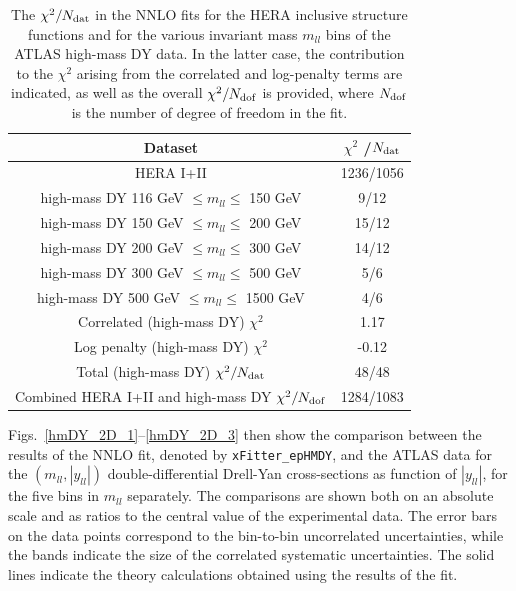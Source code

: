 \begin{table}[t]
  \centering
  \begin{tabular}{|c|c|}
    \hline
    Dataset  &   $\chi^2$ /$N_{\rm dat}$ \\
    \hline
    \hline
    HERA I+II & 1236/1056\\
    \hline
    high-mass DY  116 GeV $\le m_{ll} \le $ 150 GeV  &  9/12 \\
    high-mass DY  150 GeV $\le m_{ll} \le $ 200 GeV  &  15/12 \\
    high-mass DY  200 GeV $\le m_{ll} \le $ 300 GeV  &  14/12 \\
    high-mass DY  300 GeV $\le m_{ll} \le $ 500 GeV  &  5/6 \\
    high-mass DY  500 GeV $\le m_{ll} \le $ 1500 GeV &  4/6 \\
    \hline
    Correlated (high-mass DY) $\chi^2$ & 1.17 \\
    Log penalty (high-mass DY) $\chi^2$  & -0.12 \\
    \hline
    Total  (high-mass DY) $\chi^2/N_{\rm dat}$  & 48/48 \\
    \hline
    \hline
    Combined HERA I+II and high-mass DY $\chi^2/N_{\rm dof}$   & 1284/1083 \\
    \hline
    \end{tabular}
  \caption{The $\chi^{2}/N_{\rm dat}$ in the NNLO fits for the
    HERA inclusive structure functions and for the various
    invariant mass $m_{ll}$ bins of the ATLAS high-mass DY data.
    In the latter case, the contribution to the
    $\chi^2$ arising from the correlated and log-penalty terms are indicated,
    as well as the overall $\chi^2/N_{\rm dof}$ is provided,  where $N_{\rm dof}$ is
    the number of degree of freedom in the fit.
\label{tab:chi2fit}
  }
\end{table}

Figs.~\ref{hmDY_2D_1}--\ref{hmDY_2D_3} then show the
comparison between the results of the NNLO fit,
denoted by {\tt xFitter\_epHMDY},
and the ATLAS data
  for the $(m_{ll},|y_{ll}|)$ double-differential Drell-Yan cross-sections
  as function of $|y_{ll}|$, for the five bins in $m_{ll}$ separately.
  The comparisons are shown both
  on an absolute scale  and as ratios to the central value
  of the experimental data.
  The error bars on the data points correspond to the bin-to-bin uncorrelated
  uncertainties, while the bands
  indicate the size of the correlated systematic uncertainties.
  The solid lines indicate the theory calculations obtained using the results
  of the fit.


